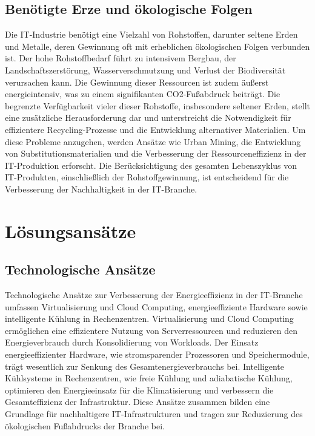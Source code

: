 \documentclass[12pt]{article}
\begin{document}
\subsection{Benötigte Erze und ökologische Folgen}
Die IT-Industrie benötigt eine Vielzahl von Rohstoffen, darunter seltene Erden und Metalle, deren Gewinnung oft mit erheblichen ökologischen Folgen verbunden ist\cite{unctad2019}. Der hohe Rohstoffbedarf führt zu intensivem Bergbau, der Landschaftszerstörung, Wasserverschmutzung und Verlust der Biodiversität verursachen kann\cite{tomlinson2010}. Die Gewinnung dieser Ressourcen ist zudem äußerst energieintensiv, was zu einem signifikanten CO2-Fußabdruck beiträgt\cite{belkhir2018}. Die begrenzte Verfügbarkeit vieler dieser Rohstoffe, insbesondere seltener Erden, stellt eine zusätzliche Herausforderung dar und unterstreicht die Notwendigkeit für effizientere Recycling-Prozesse und die Entwicklung alternativer Materialien\cite{freitag2021}. Um diese Probleme anzugehen, werden Ansätze wie Urban Mining, die Entwicklung von Substitutionsmaterialien und die Verbesserung der Ressourceneffizienz in der IT-Produktion erforscht\cite{pohl2019}. Die Berücksichtigung des gesamten Lebenszyklus von IT-Produkten, einschließlich der Rohstoffgewinnung, ist entscheidend für die Verbesserung der Nachhaltigkeit in der IT-Branche\cite{bieser2019}.

\section{Lösungsansätze}
\subsection{Technologische Ansätze}
Technologische Ansätze zur Verbesserung der Energieeffizienz in der IT-Branche umfassen Virtualisierung und Cloud Computing, energieeffiziente Hardware sowie intelligente Kühlung in Rechenzentren. Virtualisierung und Cloud Computing ermöglichen eine effizientere Nutzung von Serverressourcen und reduzieren den Energieverbrauch durch Konsolidierung von Workloads\cite{murugesan2008}. Der Einsatz energieeffizienter Hardware, wie stromsparender Prozessoren und Speichermodule, trägt wesentlich zur Senkung des Gesamtenergieverbrauchs bei\cite{tomlinson2010}. Intelligente Kühlsysteme in Rechenzentren, wie freie Kühlung und adiabatische Kühlung, optimieren den Energieeinsatz für die Klimatisierung und verbessern die Gesamteffizienz der Infrastruktur\cite{oró2015}. Diese Ansätze zusammen bilden eine Grundlage für nachhaltigere IT-Infrastrukturen und tragen zur Reduzierung des ökologischen Fußabdrucks der Branche bei\cite{jenkin2011}.
\end{document}
